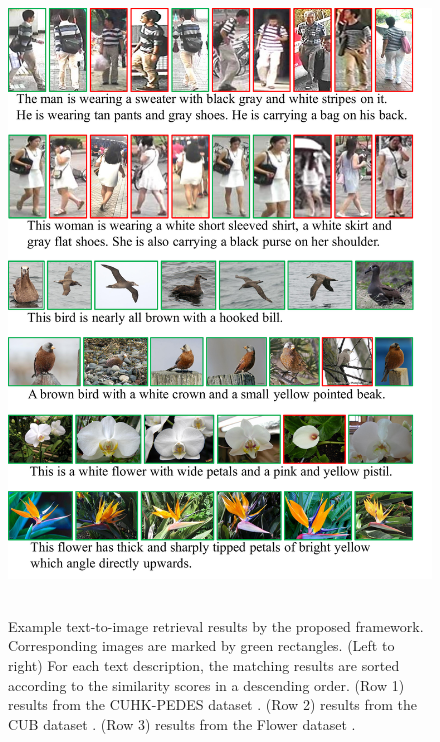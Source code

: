 \begin{figure}
	\begin{center}
		\includegraphics[width=0.9\linewidth]{figures/textual_visual_matching/retrievaliccv17.pdf} \ \\
	\end{center}
	\caption{Example text-to-image retrieval results by the proposed framework. Corresponding images
		are marked by green rectangles. (Left to right) For each text description, the matching results are sorted according to the similarity scores in a descending order. (Row 1) results from the CUHK-­PEDES dataset \cite{li2017person}. (Row 2) results from the CUB dataset \cite{reed2016learning}. (Row 3) results from the Flower dataset \cite{reed2016learning}.}
	\vspace{-5pt}
	\label{fig:retrieval}
\end{figure}

